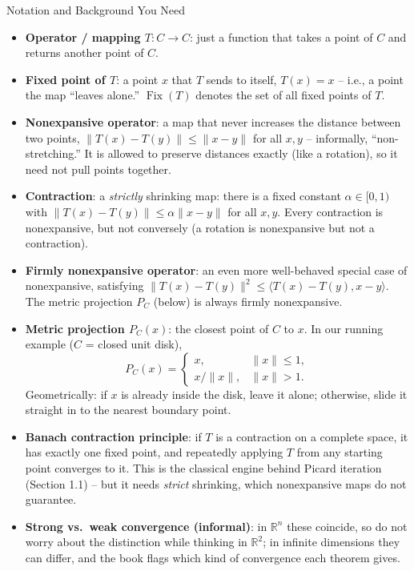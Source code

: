 \documentclass[aspectratio=169,10pt]{beamer}
\newcommand{\Fix}{\operatorname{Fix}}
\newcommand{\R}{\mathbb{R}}
\begin{document}
\begin{frame}[allowframebreaks]{Notation and Background You Need}
\begin{itemize}
  \item \textbf{Operator / mapping $T:C\to C$}: just a function that takes
    a point of $C$ and returns another point of $C$.
  \item \textbf{Fixed point of $T$}: a point $x$ that $T$ sends to itself,
    $T(x)=x$ -- i.e., a point the map ``leaves alone.'' $\Fix(T)$ denotes
    the set of all fixed points of $T$.
  \item \textbf{Nonexpansive operator}: a map that never increases the
    distance between two points, $\|T(x)-T(y)\|\le\|x-y\|$ for all $x,y$ --
    informally, ``non-stretching.'' It is allowed to preserve distances
    exactly (like a rotation), so it need not pull points together.
  \item \textbf{Contraction}: a \emph{strictly} shrinking map: there is a
    fixed constant $\alpha\in[0,1)$ with $\|T(x)-T(y)\|\le\alpha\|x-y\|$ for
    all $x,y$. Every contraction is nonexpansive, but not conversely
    (a rotation is nonexpansive but not a contraction).
  \item \textbf{Firmly nonexpansive operator}: an even more well-behaved
    special case of nonexpansive, satisfying
    $\|T(x)-T(y)\|^2\le\langle T(x)-T(y),x-y\rangle$. The metric projection
    $P_C$ (below) is always firmly nonexpansive.

\framebreak

  \item \textbf{Metric projection $P_C(x)$}: the closest point of $C$ to
    $x$. In our running example ($C$ = closed unit disk),
    \[
      P_C(x) = \begin{cases} x, & \|x\|\le 1,\\[2pt] x/\|x\|, & \|x\|>1.\end{cases}
    \]
    Geometrically: if $x$ is already inside the disk, leave it alone;
    otherwise, slide it straight in to the nearest boundary point.
  \item \textbf{Banach contraction principle}: if $T$ is a contraction on a
    complete space, it has exactly one fixed point, and repeatedly applying
    $T$ from any starting point converges to it. This is the classical
    engine behind Picard iteration (Section 1.1) -- but it needs
    \emph{strict} shrinking, which nonexpansive maps do not guarantee.
  \item \textbf{Strong vs.\ weak convergence (informal)}: in $\R^n$ these
    coincide, so do not worry about the distinction while thinking in
    $\R^2$; in infinite dimensions they can differ, and the book flags
    which kind of convergence each theorem gives.
\end{itemize}

\end{frame}
\end{document}
